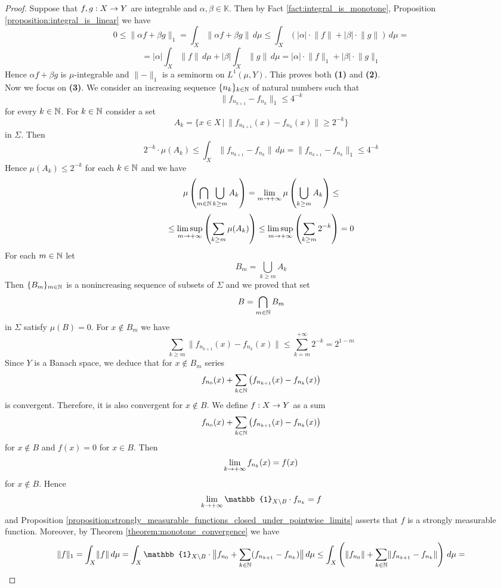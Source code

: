 \begin{proof}
Suppose that $f, g:X\rightarrow Y$ are integrable and $\alpha, \beta\in \mathbb{K}$. Then by Fact \ref{fact:integral_is_monotone}, Proposition \ref{proposition:integral_is_linear} we have
$$0 \leq \lVert \alpha f+ \beta g\rVert_1 = \int_X\lVert \alpha f + \beta g\rVert\,d\mu \leq \int_X\left(|\alpha|\cdot \lVert f\rVert+ |\beta|\cdot \lVert g \rVert\right)\,d\mu= $$
$$= |\alpha| \int_X\lVert f\rVert \,d\mu + |\beta| \int_X\lVert g \rVert\,d\mu = |\alpha| \cdot \lVert f \rVert_1+ |\beta| \cdot \lVert g \rVert_1 $$
Hence $\alpha f+ \beta g$ is $\mu$-integrable and $\lVert -\rVert_1$ is a seminorm on $L^1(\mu,Y)$. This proves both \textbf{(1)} and \textbf{(2)}.\\
Now we focus on \textbf{(3)}. We consider an increasing sequence $\{n_k\}_{k\in {\mathbb N}}$ of natural numbers such that
$$\lVert f_{n_{k+1}} - f_{n_k}\rVert_1\leq 4^{-k}$$
for every $k\in {\mathbb N}$. For $k\in {\mathbb N}$ consider a set
$$A_k = \big\{x \in X\,\big|\,\lVert f_{n_{k+1}}(x) - f_{n_k}(x)\rVert \geq 2^{-k}\big\}$$
in $\Sigma$. Then
$$2^{-k} \cdot \mu(A_k)\leq \int_X\lVert f_{n_{k+1}}-f_{n_k}\rVert \,d\mu = \lVert f_{n_{k+1}} - f_{n_k}\rVert_1 \leq 4^{-k}$$
Hence $\mu(A_k)\leq 2^{-k}$ for each $k\in {\mathbb N}$ and we have
$$\mu\left(\bigcap_{m\in {\mathbb N}}\bigcup_{k\geq m}A_k\right) = \lim_{m\rightarrow +\infty} \mu\left(\bigcup_{k\geq m}A_k\right)\leq $$
$$\leq \limsup_{m\rightarrow +\infty}\left(\sum_{k\geq m}\mu(A_k)\right) \leq \limsup_{m\rightarrow +\infty}\left(\sum_{k\geq m}2^{-k}\right) = 0$$
For each $m\in {\mathbb N}$ let
$$B_m = \bigcup_{k\geq m}A_k$$
Then $\{B_m\}_{m\in {\mathbb N}}$ is a nonincreasing sequence of subsets of $\Sigma$ and we proved that set
$$B = \bigcap_{m\in {\mathbb N}}B_m$$
in $\Sigma$ satisfy $\mu(B) = 0$. For $x\not \in B_m$ we have
$$\sum_{k\geq m}\lVert f_{n_{k+1}}(x) - f_{n_k}(x)\rVert \leq \sum_{k=m}^{+\infty}2^{-k} = 2^{1-m}$$
Since $Y$ is a Banach space, we deduce that for $x\not \in B_m$ series
$$f_{n_0}(x) + \sum_{k\in {\mathbb N}}\left(f_{n_{k+1}}(x) - f_{n_k}(x)\right)$$
is convergent. Therefore, it is also convergent for $x\not \in B$. We define $f:X\rightarrow Y$ as a sum
$$f_{n_0}(x) + \sum_{k\in {\mathbb N}}\left(f_{n_{k+1}}(x) - f_{n_k}(x)\right)$$
for $x\not \in B$ and $f(x) = 0$ for $x\in B$. Then
$$\lim_{k\rightarrow +\infty}f_{n_k}(x) = f(x)$$
for $x \not \in B$. Hence
$$\lim_{k\ra +\infty}\mathbb{1}_{X\setminus B}\cdot f_{n_k} = f$$
and Proposition \ref{proposition:strongly_measurable_functions_closed_under_pointwise_limits} asserts that $f$ is a strongly measurable function. Moreover, by Theorem \ref{theorem:monotone_convergence} we have
$$\lVert f \rVert_1 = \int_X\lVert f\rVert \,d\mu = \int_X\mathbb{1}_{X\setminus B}\cdot \big \lVert f_{n_0} + \sum_{k\in \NN}(f_{n_{k+1}} - f_{n_k})\big \rVert \,d\mu \leq \int_X\left(\lVert f_{n_0}\rVert  + \sum_{k\in \NN}\lVert f_{n_{k+1}}-f_{n_k}\rVert \right)\,d\mu = $$

\end{proof}
